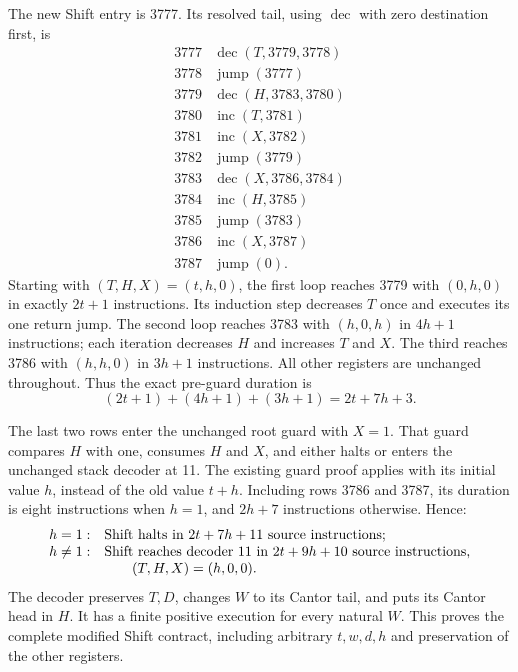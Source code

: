 The new Shift entry is 3777.  Its resolved tail, using $\operatorname{dec}$
with zero destination first, is
\[
\begin{array}{r|l}
3777&\operatorname{dec}(T,3779,3778)\\
3778&\operatorname{jump}(3777)\\
3779&\operatorname{dec}(H,3783,3780)\\
3780&\operatorname{inc}(T,3781)\\
3781&\operatorname{inc}(X,3782)\\
3782&\operatorname{jump}(3779)\\
3783&\operatorname{dec}(X,3786,3784)\\
3784&\operatorname{inc}(H,3785)\\
3785&\operatorname{jump}(3783)\\
3786&\operatorname{inc}(X,3787)\\
3787&\operatorname{jump}(0).
\end{array}
\]
Starting with $(T,H,X)=(t,h,0)$, the first loop reaches 3779 with
$(0,h,0)$ in exactly $2t+1$ instructions.  Its induction step decreases
$T$ once and executes its one return jump.  The second loop reaches 3783
with $(h,0,h)$ in $4h+1$ instructions; each iteration decreases $H$ and
increases $T$ and $X$.  The third reaches 3786 with $(h,h,0)$ in $3h+1$
instructions.  All other registers are unchanged throughout.  Thus the
exact pre-guard duration is
\[
  (2t+1)+(4h+1)+(3h+1)=2t+7h+3.
\]

The last two rows enter the unchanged root guard with $X=1$.  That guard
compares $H$ with one, consumes $H$ and $X$, and either halts or enters
the unchanged stack decoder at 11.  The existing guard proof applies
with its initial value $h$, instead of the old value $t+h$.  Including
rows 3786 and 3787, its duration is eight instructions when $h=1$, and
$2h+7$ instructions otherwise.  Hence:
\[
\begin{array}{ll}
h=1:&\text{Shift halts in }2t+7h+11\text{ source instructions};\\
h\ne1:&\text{Shift reaches decoder 11 in }2t+9h+10
            \text{ source instructions,}\\
 &\hspace{7mm}(T,H,X)=(h,0,0).
\end{array}
\]
The decoder preserves $T,D$, changes $W$ to its Cantor tail, and puts its
Cantor head in $H$.  It has a finite positive execution for every natural
$W$.  This proves the complete modified Shift contract, including arbitrary
$t,w,d,h$ and preservation of the other registers.

